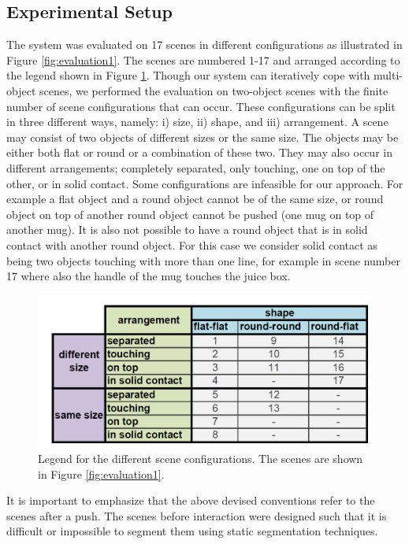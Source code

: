 \subsection{Experimental Setup}
The system was evaluated on 17 scenes in different configurations
as illustrated in Figure \ref{fig:evaluation1}. The   scenes  are   
numbered  1-17 and arranged according to the legend shown in Figure \ref{fig:table_scenes}.
Though our system can iteratively
cope with multi-object scenes, we performed the evaluation on two-object
scenes with the  finite number  of scene
configurations that  can occur. These configurations  can be split in  three different
ways, namely: i)  size, ii) shape, and iii)  arrangement.  A scene may
consist  of two  objects  of different  sizes  or the  same size.  The
objects may  be either both  flat or round  or a combination  of these
two.  They  may  also  occur  in  different  arrangements;  completely
separated, only  touching, one on  top of the other,  or in solid
contact. Some configurations are
infeasible for our approach.  For example a flat  object and a
round  object cannot  be of the  same  size, or  round object  on top  of
another  round object  cannot be  pushed (one  mug on  top  of another
mug). It is also not possible to  have a round object that is in solid
contact with  another round  object. For this  case we  consider solid
contact as  being two objects touching  with more than  one line, for
example in scene number 17 where also  the handle of the mug  touches the juice box.  

\begin{figure}[ht!]
  \centering \includegraphics[width=0.8\columnwidth]{figures/table_scenes.png}
  \vspace{-2ex}
  \caption{Legend for the different scene configurations. The scenes are shown in Figure \ref{fig:evaluation1}.
  }
  \label{fig:table_scenes}
\end{figure}

It is  important to  emphasize that the above  devised conventions 
refer to  the scenes after a  push. The scenes  before interaction were
designed such that it is difficult or impossible to segment
them using static segmentation techniques.
 
